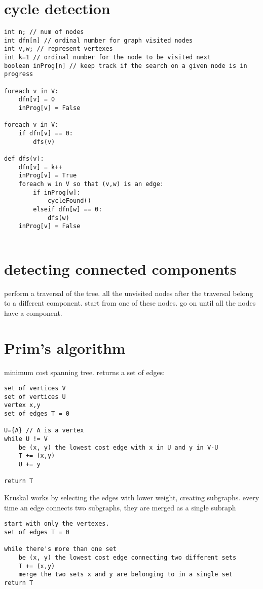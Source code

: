\documentclass[a4paper,12pt,oneside]{book}
\begin{document}
\section{cycle detection}

\begin{verbatim}
int n; // num of nodes
int dfn[n] // ordinal number for graph visited nodes
int v,w; // represent vertexes
int k=1 // ordinal number for the node to be visited next
boolean inProg[n] // keep track if the search on a given node is in progress

foreach v in V:
    dfn[v] = 0
    inProg[v] = False

foreach v in V:
    if dfn[v] == 0:
        dfs(v)

def dfs(v):
    dfn[v] = k++
    inProg[v] = True
    foreach w in V so that (v,w) is an edge:
        if inProg[w]:
            cycleFound()
        elseif dfn[w] == 0:
            dfs(w)
    inProg[v] = False


\end{verbatim}

\section{detecting connected components}

perform a traversal of the tree. all the unvisited nodes after the traversal
belong to a different component. start from one of these nodes. go on until
all the nodes have a component.

\section{Prim's algorithm}

minimum cost spanning tree. returns a set of edges:

\begin{verbatim}
set of vertices V
set of vertices U
vertex x,y
set of edges T = 0

U={A} // A is a vertex
while U != V
    be (x, y) the lowest cost edge with x in U and y in V-U
    T += (x,y)
    U += y
    
return T
\end{verbatim}

Kruskal works by selecting the edges with lower weight, creating subgraphs.
every time an edge connects two subgraphs, they are merged as a single
subraph

\begin{verbatim}
start with only the vertexes.
set of edges T = 0

while there's more than one set
    be (x, y) the lowest cost edge connecting two different sets
    T += (x,y)
    merge the two sets x and y are belonging to in a single set
return T
\end{verbatim}
\end{document}
